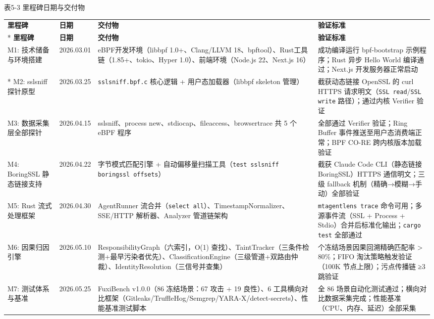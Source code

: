 \documentclass[a4paper]{ctexart}
\makeatletter
\renewcommand{\_}{%
  \ifmmode
    \nfss@text{\textunderscore}%
  \else
    \textunderscore\discretionary{}{}{}%
  \fi}
\makeatother
\begin{document}
\medskip
{\centering\small
表5-3 里程碑日期与交付物\par
\vspace{3pt}
\setlength{\tabcolsep}{6pt}
\renewcommand{\arraystretch}{1.1}
\begin{longtable}{p{4.3cm} p{2.7cm} >{\raggedright\arraybackslash}p{3.7cm} >{\raggedright\arraybackslash}p{3.7cm}}
\hline
\textbf{里程碑} & \textbf{日期} & \textbf{交付物} & \textbf{验证标准} \\*
\hline
\endfirsthead
\hline
\textbf{里程碑} & \textbf{日期} & \textbf{交付物} & \textbf{验证标准} \\
\hline
\endhead
\hline
\endfoot
\hline
\endlastfoot
M1: 技术储备与环境搭建 & 2026.03.01 & eBPF开发环境（libbpf 1.0+、Clang/LLVM 18、bpftool）、Rust工具链（1.85+、tokio、Hyper 1.0）、前端环境（Node.js 22、Next.js 16） & 成功编译运行 bpf-bootstrap 示例程序；Rust 异步 Hello World 编译通过；Next.js 开发服务器正常启动 \\*
\hline
M2: sslsniff 探针原型 & 2026.03.25 & \texttt{sslsniff.bpf.c} 核心逻辑 + 用户态加载器（libbpf skeleton 管理） & 截获动态链接 OpenSSL 的 curl HTTPS 请求明文（\texttt{SSL\_read}/\texttt{SSL\_write} 路径）；通过内核 Verifier 验证 \\
\hline
M3: 数据采集层全部探针 & 2026.04.15 & sslsniff、process\_new、stdiocap、fileaccess、browsertrace 共 5 个 eBPF 程序 & 全部通过 Verifier 验证；Ring Buffer 事件推送至用户态消费端正常；BPF CO-RE 跨内核版本加载验证 \\
\hline
M4: BoringSSL 静态链接支持 & 2026.04.22 & 字节模式匹配引擎 + 自动偏移量扫描工具（\texttt{test\_sslsniff\_boringssl\_offsets}） & 截获 Claude Code CLI（静态链接 BoringSSL）HTTPS 通信明文；三级 fallback 机制（精确→模糊→手动）全部验证 \\
\hline
M5: Rust 流式处理框架 & 2026.04.30 & AgentRunner 流合并（\texttt{select\_all}）、TimestampNormalizer、SSE/HTTP 解析器、Analyzer 管道链架构 & \texttt{mtagentlens trace} 命令可用；多源事件流（SSL + Process + Stdio）合并后标准化输出；\texttt{cargo test} 全部通过 \\
\hline
M6: 因果归因引擎 & 2026.05.10 & ResponsibilityGraph（六索引，O(1) 查找）、TaintTracker（三条件检测+最早污染者优先）、ClassificationEngine（三级管道+双路由仲裁）、IdentityResolution（三信号并查集） & 10 个冻结场景因果回溯精确匹配率 > 80\%；FIFO 淘汰策略触发验证（100K 节点上限）；污点传播链 ≥3 跳验证 \\
\hline
M7: 测试体系与基准 & 2026.05.25 & FuxiBench v1.0.0（86 冻结场景：67 攻击 + 19 良性）、6 工具横向对比框架（Gitleaks/\allowbreak TruffleHog/\allowbreak Semgrep/\allowbreak YARA-X/\allowbreak detect-secrets）、性能基准测试脚本 & 全 86 场景自动化测试通过；横向对比数据采集完成；性能基准（CPU、内存、延迟）全部采集 \\

\end{longtable}}
\end{document}
